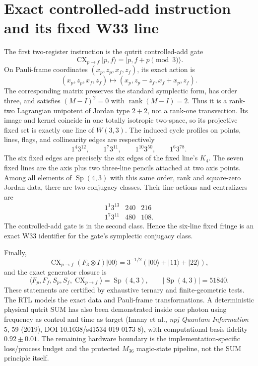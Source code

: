 \providecommand{\Sp}{\operatorname{Sp}}
\section*{Exact controlled-add instruction and its fixed W33 line}
The first two-register instruction is the qutrit controlled-add gate
\[
 \operatorname{CX}_{p\to f}\lvert p,f\rangle
 =\lvert p,f+p\pmod 3\rangle.
\]
On Pauli-frame coordinates \((x_p,z_p,x_f,z_f)\), its exact action is
\[
 (x_p,z_p,x_f,z_f)\mapsto(x_p,z_p-z_f,x_f+x_p,z_f).
\]
The corresponding matrix preserves the standard symplectic form, has order three,
and satisfies \((M-I)^2=0\) with \(\operatorname{rank}(M-I)=2\). Thus it is a
rank-two Lagrangian unipotent of Jordan type \(2+2\), not a rank-one transvection.
Its image and kernel coincide in one totally isotropic two-space, so its projective
fixed set is exactly one line of \(W(3,3)\). The induced cycle profiles on points,
lines, flags, and collinearity edges are respectively
\[
 1^4 3^{12},\qquad 1^7 3^{11},\qquad 1^{10}3^{50},\qquad 1^6 3^{78}.
\]
The six fixed edges are precisely the six edges of the fixed line's \(K_4\). The seven
fixed lines are the axis plus two three-line pencils attached at two axis points.
Among all elements of \(\Sp(4,3)\) with this same order, rank and square-zero
Jordan data, there are two conjugacy classes. Their line actions and centralizers are
\[
\begin{array}{c|c|c}
1^1 3^{13}&240&216\\
1^7 3^{11}&480&108.
\end{array}
\]
The controlled-add gate is in the second class. Hence the six-line fixed fringe is an
exact W33 identifier for the gate's symplectic conjugacy class.

Finally,
\[
 \operatorname{CX}_{p\to f}(F_3\otimes I)\lvert00\rangle
 =3^{-1/2}(\lvert00\rangle+\lvert11\rangle+\lvert22\rangle),
\]
and the exact generator closure is
\[
 \langle F_p,F_f,S_p,S_f,\operatorname{CX}_{p\to f}\rangle=\Sp(4,3),
 \qquad |\Sp(4,3)|=51840.
\]
These statements are certified by exhaustive ternary and finite-geometric tests. The RTL
models the exact data and Pauli-frame transformations. A deterministic physical qutrit
SUM has also been demonstrated inside one photon using frequency as control and time as
target (Imany et al., \emph{npj Quantum Information} 5, 59 (2019), DOI
10.1038/s41534-019-0173-8), with computational-basis fidelity \(0.92\pm0.01\).
The remaining hardware boundary is the implementation-specific loss/process budget and
the protected \(M_{36}\) magic-state pipeline, not the SUM principle itself.
